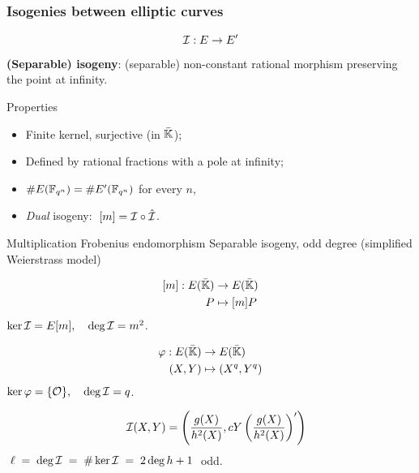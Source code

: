 \documentclass[10pt]{beamer}
\begin{document}
\begin{frame}
  \frametitle{Isogenies between elliptic curves}
  
  \vspace{-2mm}

  {\large \[\mathcal{I}:E\to E'\]} \textbf{(Separable) isogeny}: (separable)
  non-constant rational morphism preserving the point at infinity.
  
  \begin{block}{Properties}
    \begin{itemize}
    \item Finite kernel, surjective (in $\bar{\mathbb{K}}$);
    \item Defined by rational fractions with a pole at infinity;
    \item $\# E(\mathbb{F}_{q^n}) = \# E'(\mathbb{F}_{q^n})$ for every $n$,
    \item \emph{Dual} isogeny: $\;[m] = \mathcal{I}\circ\hat{\mathcal{I}}$.
    \end{itemize}
  \end{block}

  \vspace{-1mm}

  \begin{block}{
	\begin{overprint}
	 Multiplication	
	\onslide<2> Frobenius endomorphism
	\onslide<3> Separable isogeny, odd degree (simplified Weierstrass model)
	\end{overprint}
      }
    \begin{overprint}
      \[\begin{aligned}
	{}[m] : E(\bar{\mathbb{K}}) &\rightarrow E(\bar{\mathbb{K}})\\
	                   P &\mapsto [m]P
      \end{aligned}\]
      $\ker\mathcal{I} = E[m], \quad\deg\mathcal{I} = m^2$.

      \[\begin{aligned}
	\varphi : E(\bar{\mathbb{K}}) &\rightarrow E(\bar{\mathbb{K}})\\
	               (X,Y) &\mapsto (X^q,Y^q)
      \end{aligned}\]
      $\ker\varphi = \{\mathcal{O}\}, \quad\deg\mathcal{I} = q$.

      \[\quad\mathcal{I}(X,Y) = \left(\frac{g(X)}{h^2(X)},
      cY\left(\frac{g(X)}{h^2(X)}\right)'\right)\]
      $\;\ell\;=\;\deg\mathcal{I}\;=\;
      \# \ker\mathcal{I} \;=\; 2\deg h + 1\;$ odd.
    \end{overprint}
  \end{block}
\end{frame}
\end{document}
